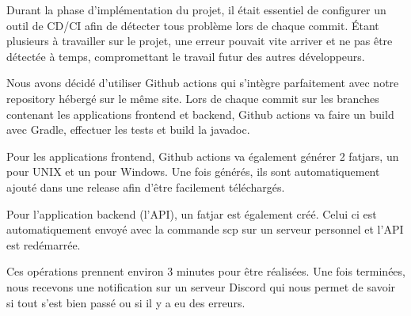 \documentclass[../rapport.tex]{subfiles}
\begin{document}
Durant la phase d'implémentation du projet, il était essentiel de configurer un outil de CD/CI afin de détecter tous problème lors de chaque commit.
Étant plusieurs à travailler sur le projet, une erreur pouvait vite arriver et ne pas être détectée à temps, compromettant le travail futur des autres développeurs. 

Nous avons décidé d'utiliser Github actions qui s'intègre parfaitement avec notre repository hébergé sur le même site.
Lors de chaque commit sur les branches contenant les applications frontend et backend, Github actions va faire un build avec Gradle, effectuer les tests et build la javadoc. 

Pour les applications frontend, Github actions va également générer 2 fatjars, un pour UNIX et un pour Windows.
Une fois générés, ils sont automatiquement ajouté dans une release afin d'être facilement téléchargés.

Pour l'application backend (l'API), un fatjar est également créé.
Celui ci est automatiquement envoyé avec la commande scp sur un serveur personnel et l'API est redémarrée.

Ces opérations prennent environ 3 minutes pour être réalisées.
Une fois terminées, nous recevons une notification sur un serveur Discord qui nous permet de savoir si tout s'est bien passé ou si il y a eu des erreurs.
\end{document}
